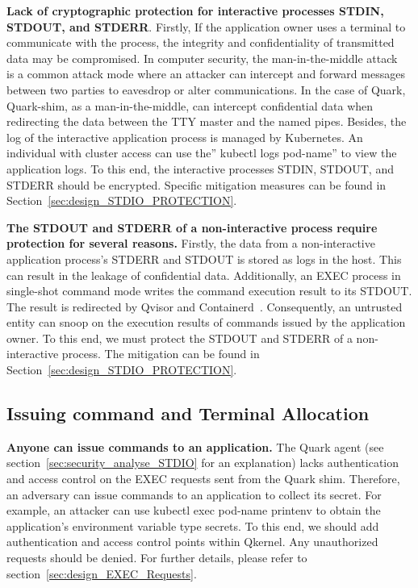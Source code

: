 \textbf{Lack of cryptographic protection for interactive processes STDIN, STDOUT, and STDERR}. Firstly, If the application owner uses a terminal to communicate with the process, the integrity and confidentiality of transmitted data may be compromised. In computer security, the man-in-the-middle 
attack~\cite*{Man_in_the_middle_attack} is a common attack mode where an attacker can intercept and forward messages between two parties to eavesdrop or alter communications. In the case of Quark,  Quark-shim, as a man-in-the-middle, can intercept confidential data when redirecting the data between the TTY master and the named 
pipes. Besides, the log of the interactive application process is managed by Kubernetes. An individual with cluster access can use the” kubectl logs pod-name” to view the application logs. To this end, the interactive processes STDIN, STDOUT, and STDERR should be encrypted. Specific mitigation measures can be 
found in  Section~\ref{sec:design_STDIO_PROTECTION}.
 
 
\textbf{The STDOUT and STDERR of a non-interactive process require protection for several reasons.} Firstly, the data from a non-interactive application process’s STDERR and STDOUT is stored as logs in the host. This can result in the leakage of confidential data. Additionally, an EXEC process in 
single-shot command mode writes the command execution result to its STDOUT. The result is redirected by Qvisor and Containerd~\cite*{containerd}. Consequently, an untrusted entity can snoop on the execution results of commands issued by the application owner. To this end, we must protect the STDOUT and STDERR of a non-interactive process. The mitigation can be found in  Section~\ref{sec:design_STDIO_PROTECTION}.


\subsection{Issuing command and Terminal Allocation}
\textbf{Anyone can issue commands to an application.} The Quark agent (see section~\ref{sec:security_analyse_STDIO} for an explanation) lacks authentication and access control on the EXEC requests sent from the Quark shim. Therefore, an adversary can issue commands to an application to collect its secret. For example, an attacker can use kubectl exec pod-name printenv to obtain the application’s environment variable type secrets. To this end, we should add authentication and access control points within Qkernel. Any unauthorized requests should be denied. For further details, please 
refer to section~\ref{sec:design_EXEC_Requests}.

